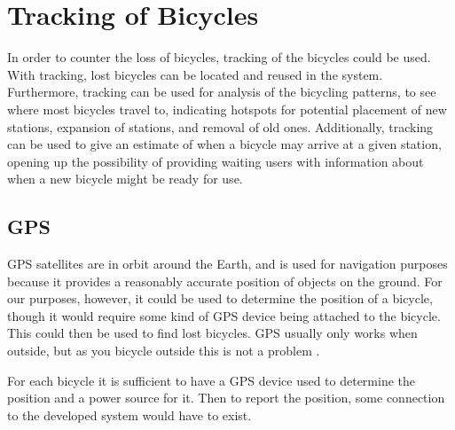 \section{Tracking of Bicycles}
In order to counter the loss of bicycles, tracking of the bicycles could be used.
With tracking, lost bicycles can be located and reused in the system.
Furthermore, tracking can be used for analysis of the bicycling patterns, to see where most bicycles travel to, indicating hotspots for potential placement of new stations, expansion of stations, and removal of old ones.
Additionally, tracking can be used to give an estimate of when a bicycle may arrive at a given station, opening up the possibility of providing waiting users with information about when a new bicycle might be ready for use.

\subsection{GPS}
GPS satellites are in orbit around the Earth, and is used for navigation purposes because it provides a reasonably accurate position of objects on the ground.
For our purposes, however, it could be used to determine the position of a bicycle, though it would require some kind of GPS device being attached to the bicycle.
This could then be used to find lost bicycles.
GPS usually only works when outside, but as you bicycle outside this is not a problem \citep{misc:howgpsworks}.

For each bicycle it is sufficient to have a GPS device used to determine the position and a power source for it.
Then to report the position, some connection to the developed system would have to exist.

